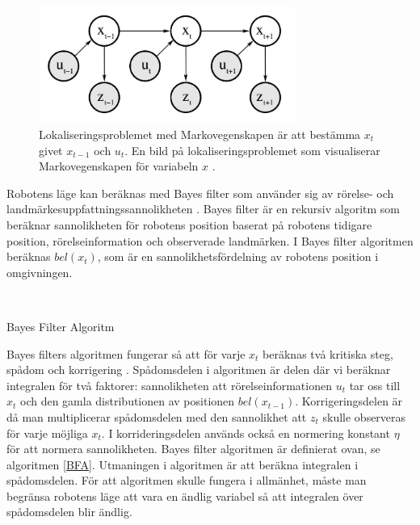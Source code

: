 \begin{figure}[ht]
    \begin{center}
    \includegraphics[width=0.75\textwidth]{markov.JPG}
    \caption{Lokaliseringsproblemet med Markovegenskapen är att bestämma $x_t$ givet $x_{t-1}$ och $u_t$. En bild på lokaliseringsproblemet som visualiserar Markovegenskapen för variabeln $x$ \citep{ProbabilisticRobotics}.}
    \label{markov}
    \end{center}
\end{figure}

Robotens läge kan beräknas med Bayes filter som använder sig av rörelse- och landmärkesuppfattningssannolikheten \citep{ProbabilisticRobotics}. Bayes filter är en rekursiv algoritm som beräknar sannolikheten för robotens position baserat på robotens tidigare position, rörelseinformation och observerade landmärken. I Bayes filter algoritmen beräknas $bel(x_t)$, som är en sannolikhetsfördelning av robotens position i omgivningen.

\begin{algorithm}[H]
    \SetAlgoLined
    \label{BFA}
     \\
    \caption{Bayes Filter Algoritm}
\end{algorithm}

Bayes filters algoritmen fungerar så att för varje $x_t$ beräknas två kritiska steg, spådom och korrigering \citep{ProbabilisticRobotics}. Spådomsdelen i algoritmen är delen där vi beräknar integralen för två faktorer: sannolikheten att rörelseinformationen $u_t$ tar oss till $x_t$ och den gamla distributionen av positionen $bel(x_{t-1})$. Korrigeringsdelen är då man multiplicerar spådomsdelen med den sannolikhet att $z_t$ skulle observeras för varje möjliga $x_t$. I korrideringsdelen används också en normering konstant $\eta$ för att normera sannolikheten. Bayes filter algoritmen är definierat ovan, se algoritmen \ref{BFA}. Utmaningen i algoritmen är att beräkna integralen i spådomsdelen. För att algoritmen skulle fungera i allmänhet, måste man begränsa robotens läge att vara en ändlig variabel så att integralen över spådomsdelen blir ändlig.

